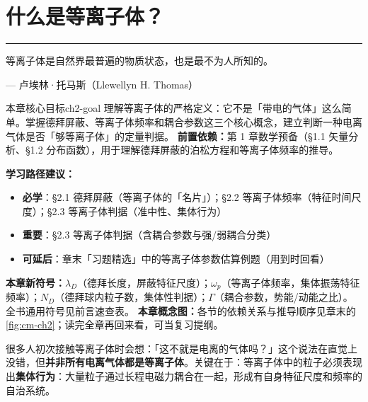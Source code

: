 \documentclass[12pt,a4paper,openany,oneside]{book}
\let\plainepigraph\epigraph
\renewcommand{\epigraph}[2]{%
  \par\addvspace{1.5pt}\noindent\hfill{\color{figAmber!75}\rule{2.8cm}{0.6pt}}\par
  \vspace{0.6pt}\plainepigraph{#1}{#2}}
\begin{document}



\chapter{什么是等离子体？}\label{ch:2}
\epigraph{等离子体是自然界最普遍的物质状态，也是最不为人所知的。}{--- 卢埃林·托马斯（Llewellyn H. Thomas）}

\begin{insight}{本章核心目标}{ch2-goal}
理解等离子体的严格定义：它不是「带电的气体」这么简单。掌握德拜屏蔽、等离子体频率和耦合参数这三个核心概念，建立判断一种电离气体是否「够等离子体」的定量判据。
\tcblower
\textbf{前置依赖：}第 1 章数学预备（\S 1.1 矢量分析、\S 1.2 分布函数），用于理解德拜屏蔽的泊松方程和等离子体频率的推导。

\textbf{学习路径建议：}

\begin{itemize}[leftmargin=*]
\item[\textcolor{red}{$\blacksquare$}] \textbf{必学}：\S 2.1 德拜屏蔽（等离子体的「名片」）；\S 2.2 等离子体频率（特征时间尺度）；\S 2.3 等离子体判据（准中性、集体行为）
\item[\textcolor{orange}{$\blacksquare$}] \textbf{重要}：\S 2.3 等离子体判据（含耦合参数与强/弱耦合分类）
\item[\textcolor{green}{$\blacksquare$}] \textbf{可延后}：章末「习题精选」中的等离子体参数估算例题（用到时回看）
\end{itemize}

\textbf{本章新符号：}$\lambda_D$（德拜长度，屏蔽特征尺度）；$\omega_p$（等离子体频率，集体振荡特征频率）；$N_D$（德拜球内粒子数，集体性判据）；$\Gamma$（耦合参数，势能/动能之比）。全书通用符号见前言速查表。
\textbf{本章概念图：}各节的依赖关系与推导顺序见章末的\cref{fig:cm-ch2}；读完全章再回来看，可当复习提纲。
\end{insight}

很多人初次接触等离子体时会想：「这不就是电离的气体吗？」这个说法在直觉上没错，但\textbf{并非所有电离气体都是等离子体}。关键在于：等离子体中的粒子必须表现出\textbf{集体行为}：大量粒子通过长程电磁力耦合在一起，形成有自身特征尺度和频率的自治系统。
\end{document}
